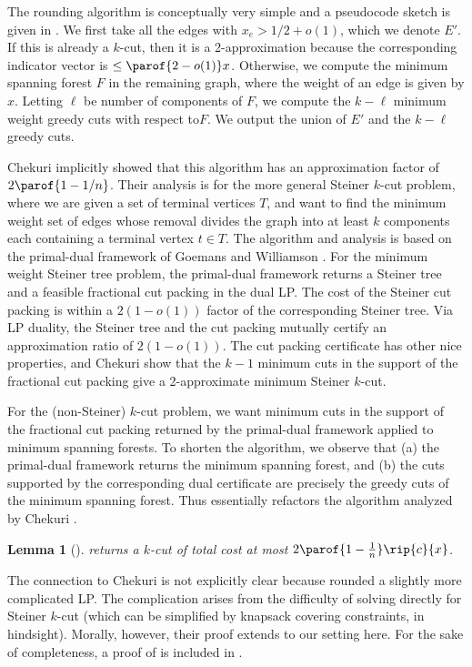\documentclass[11pt]{article}
\numberwithin{equation}{section}
\newtheorem{lemma}[theorem]{Lemma}
\theoremstyle{definition}
\theoremstyle{plain}
\newcommand{\wrt}{with respect to\xspace} %
\begin{document}
The rounding algorithm is conceptually very simple and a pseudocode
sketch is given in .  We first take
all the edges with $x_e > 1/2 + o(1)$, which we denote $E'$. If this
is already a $k$-cut, then it is a 2-approximation because the
corresponding indicator vector is $\leq \parof{2 - o(1)}
x$. Otherwise, we compute the minimum spanning forest $F$ in the
remaining graph, where the weight of an edge is given by
$x$. Letting $\ell$ be number of components of $F$, we compute the
$k - \ell$ minimum weight greedy cuts \wrt $F$.  We output the
union of $E'$ and the $k-\ell$ greedy cuts.

Chekuri \etal \cite{cgn-06} implicitly showed that this algorithm has
an approximation factor of $2 \parof{1 - 1/n}$. Their analysis is for
the more general Steiner $k$-cut problem, where we are given a set of
terminal vertices $T$, and want to find the minimum weight set of
edges whose removal divides the graph into at least $k$ components
each containing a terminal vertex $t \in T$. The algorithm and
analysis is based on the primal-dual framework of Goemans and
Williamson \cite{gw-95,gw-96}. For the minimum weight Steiner tree
problem, the primal-dual framework returns a Steiner tree and a
feasible fractional cut packing in the dual LP. The cost of the
Steiner cut packing is within a $2(1- o(1))$ factor %
of the corresponding Steiner tree. Via LP duality, the Steiner tree
and the cut packing mutually certify an approximation ratio of
$2(1-o(1))$. The cut packing certificate has other nice properties,
and Chekuri \etal \cite{cgn-06} show that the $k-1$ minimum cuts in
the support of the fractional cut packing give a 2-approximate
minimum %
Steiner $k$-cut.

For the (non-Steiner) $k$-cut problem, we want minimum cuts in the
support of the fractional cut packing returned by the primal-dual
framework applied to minimum spanning forests. To shorten the
algorithm, we observe that (a) the primal-dual framework returns the
minimum spanning forest, and (b) the cuts supported by the
corresponding dual certificate are precisely the greedy cuts of the
minimum spanning forest. Thus  essentially refactors
the algorithm analyzed by Chekuri \etal \cite{cgn-06}.

\newcommand{\GreedyCutsApx}{\algo{greedy-cuts} returns a $k$-cut of
  total cost at most $2 \parof{1 - \frac{1}{n}} \rip{c}{x}$.}
\begin{lemma}[\cite{cgn-06}]
  \GreedyCutsApx
\end{lemma}
The connection to Chekuri \etal \cite{cgn-06} is not explicitly clear
because \cite{cgn-06} rounded a slightly more complicated LP. The
complication arises from the difficulty of solving 
directly for Steiner $k$-cut (which can be simplified by knapsack
covering constraints, in hindsight). Morally, however, their proof
extends to our setting here. For the sake of completeness, a proof of
 is included in
.
\end{document}
